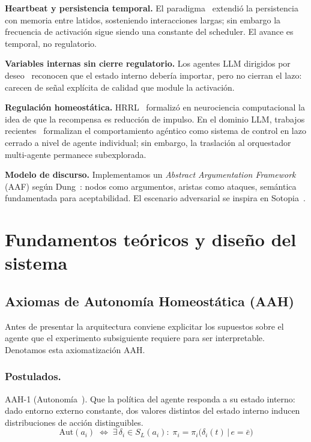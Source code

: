 \documentclass{llncs}
\begin{document}
\textbf{Heartbeat y persistencia temporal.} El
paradigma~\parencite{openclaw2025heartbeat} extendi\'o la persistencia
con memoria entre latidos, sosteniendo interacciones largas; sin embargo
la frecuencia de activaci\'on sigue siendo una constante del scheduler.
El avance es temporal, no regulatorio.

\textbf{Variables internas sin cierre regulatorio.}
Los agentes LLM dirigidos por deseo~\parencite{wang2025d2a} reconocen
que el estado interno deber\'ia importar, pero no cierran el lazo:
carecen de se\~nal expl\'icita de calidad que module la activaci\'on.

\textbf{Regulaci\'on homeost\'atica.}
HRRL~\parencite{keramati2014homeostatic} formaliz\'o en neurociencia
computacional la idea de que la recompensa es reducci\'on de impulso.
En el dominio LLM, trabajos
recientes~\parencite{eslami2026controltheoretic} formalizan el
comportamiento ag\'entico como sistema de control en lazo cerrado a
nivel de agente individual; sin embargo, la traslaci\'on al
orquestador multi-agente permanece subexplorada.

\textbf{Modelo de discurso.}
Implementamos un \emph{Abstract Argumentation Framework} (AAF) seg\'un
Dung~\parencite{dung1995acceptability}: nodos como argumentos, aristas
como ataques, sem\'antica fundamentada para aceptabilidad. El escenario
adversarial se inspira en Sotopia~\parencite{zhou2024sotopia}.

\section{Fundamentos te\'oricos y dise\~no del sistema}
\label{sec:method}

\subsection{Axiomas de Autonom\'ia Homeost\'atica (AAH)}
\label{sec:theory}

Antes de presentar la arquitectura conviene explicitar los supuestos
sobre el agente que el experimento subsiguiente requiere para ser
interpretable. Denotamos esta axiomatizaci\'on AAH.

\subsubsection{Postulados.}

\noindent\textsc{AAH-1} (Autonom\'ia~\parencite{ashby1956introduction,beer1972brain}).
Que la pol\'itica del agente responda a su estado interno: dado entorno
externo constante, dos valores distintos del estado interno inducen
distribuciones de acci\'on distinguibles.
\begin{equation}
    \mathrm{Aut}(a_i) \;\iff\; \exists\,\delta_i \in S_L(a_i):\;
    \pi_i = \pi_i\!\bigl(\delta_i(t) \,\big|\, e=\bar e\bigr)
    \label{eq:a1}
\end{equation}
\end{document}

